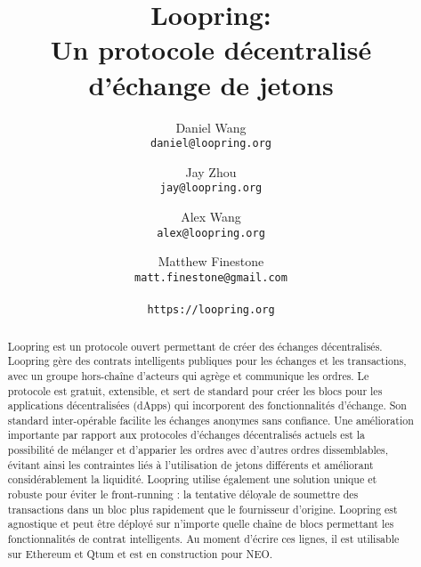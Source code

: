 \documentclass[UTF8,nofonts]{article}
\title{\textbf{Loopring:}\\\textbf{Un protocole décentralisé d'échange de jetons}}
\author{
  Daniel Wang\\
  \texttt{daniel@loopring.org}\\
  \and
  	Jay Zhou\\
  	\texttt{jay@loopring.org}\\
  	\and
  	Alex Wang\\
  	\texttt{alex@loopring.org}\\
  	\and
  	Matthew Finestone\\
  	\texttt{matt.finestone@gmail.com}\\ 
  \\
  \texttt{https://loopring.org}
 }
\begin{document}
\maketitle

\begin{abstract}
Loopring est un protocole ouvert permettant de créer des échanges décentralisés. Loopring gère des contrats intelligents publiques  pour les échanges et les transactions, avec un groupe hors-chaîne d’acteurs qui agrège et communique les ordres. Le protocole est gratuit, extensible, et sert de standard pour créer les blocs pour les applications décentralisées (dApps) qui incorporent des fonctionnalités d’échange. Son standard inter-opérable facilite les échanges anonymes sans confiance. Une amélioration importante par rapport aux protocoles d'échanges décentralisés actuels est la possibilité de mélanger et d'apparier les ordres avec d'autres ordres dissemblables, évitant ainsi les contraintes liés à l’utilisation de jetons différents et améliorant considérablement la liquidité. Loopring utilise également une solution unique et robuste pour éviter le front-running : la tentative déloyale de soumettre des transactions dans un bloc plus rapidement que le fournisseur d'origine. Loopring est agnostique et peut être déployé sur n'importe quelle chaîne de blocs permettant les fonctionnalités de contrat intelligents. Au moment d'écrire ces lignes, il est utilisable sur Ethereum  \cite{buterin2017ethereum} \cite{wood2014ethereum} et Qtum \cite{dai2017smart} et est en construction pour NEO. \cite{atterlonn2018distributed}
\end{abstract}
\end{document}
